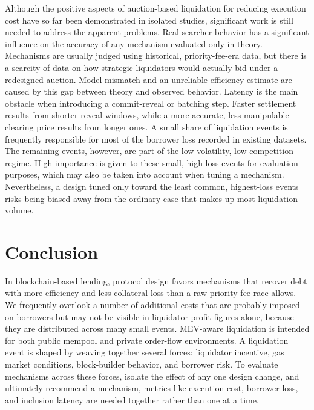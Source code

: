 \documentclass{llncs}
\begin{document}
Although the positive aspects of auction-based liquidation for reducing
execution cost have so far been demonstrated in isolated studies,
significant work is still needed to address the apparent problems. Real
searcher behavior has a significant influence on the accuracy of any
mechanism evaluated only in theory. Mechanisms are usually judged using
historical, priority-fee-era data, but there is a scarcity of data on
how strategic liquidators would actually bid under a redesigned auction.
Model mismatch and an unreliable efficiency estimate are caused by this
gap between theory and observed behavior. Latency is the main obstacle
when introducing a commit-reveal or batching step. Faster settlement
results from shorter reveal windows, while a more accurate, less
manipulable clearing price results from longer ones. A small share of
liquidation events is frequently responsible for most of the borrower
loss recorded in existing datasets. The remaining events, however, are
part of the low-volatility, low-competition regime. High importance is
given to these small, high-loss events for evaluation purposes, which
may also be taken into account when tuning a mechanism. Nevertheless, a
design tuned only toward the least common, highest-loss events risks
being biased away from the ordinary case that makes up most liquidation
volume.

\section{Conclusion}

In blockchain-based lending, protocol design favors mechanisms that
recover debt with more efficiency and less collateral loss than a raw
priority-fee race allows. We frequently overlook a number of additional
costs that are probably imposed on borrowers but may not be visible in
liquidator profit figures alone, because they are distributed across
many small events. MEV-aware liquidation is intended for both public
mempool and private order-flow environments. A liquidation event is
shaped by weaving together several forces: liquidator incentive, gas
market conditions, block-builder behavior, and borrower risk. To
evaluate mechanisms across these forces, isolate the effect of any one
design change, and ultimately recommend a mechanism, metrics like
execution cost, borrower loss, and inclusion latency are needed together
rather than one at a time.
\end{document}
